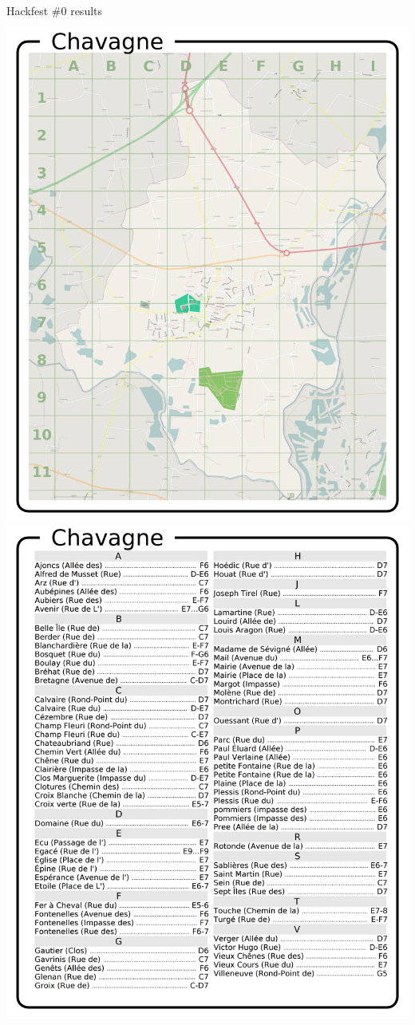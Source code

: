 \documentclass{beamer}
\begin{document}
\begin{frame}{Hackfest \#0 results}
  \begin{center}
    \includegraphics[height=0.8\textheight]{chavagne.png}
    \includegraphics[height=0.8\textheight]{chavagne_index.png}
  \end{center}
\end{frame}
\end{document}
